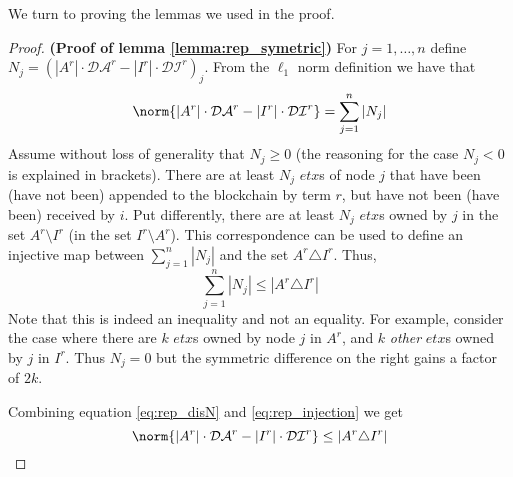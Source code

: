 We turn to proving the lemmas we used in the proof. 
\begin{proof}\textbf{(Proof of lemma \ref{lemma:rep_symetric})}
For $j=1,\dots,n$ define $N_j=\left(|A^r|\cdot \mathcal{DA}^r-|I^r|\cdot \mathcal{DI}^{r}\right)_j$. From the $\ell _1$ norm definition we have that
\begin{equation} \label{eq:rep_disN}
\norm{|A^r|\cdot \mathcal{DA}^r-|I^r|\cdot \mathcal{DI}^{r}} =\sum _{j=1}^n \left |N_j \right |
\end{equation} 
Assume without loss of generality that $N_j\geq 0$ (the reasoning for the case $N_j<0$ is explained in brackets). There are at least $N_j$ $etx$s of node $j$ that have been (have not been) appended to the blockchain by term $r$, but have not been (have been) received by $i$. Put differently, there are at least $N_j$ $etx$s owned by $j$ in the set $A^r \setminus I^{r}$ (in the set $I^{r}\setminus A^r$). This correspondence can be used to define an injective map between $\sum _{j=1}^n \left |N_j \right |$ and the set $A^r \triangle I^{r}$. Thus,
\begin{equation}\label{eq:rep_injection}
\sum _{j=1}^n \left |N_j \right |\leq |A^r \triangle I^{r}| 
\end{equation}
Note that this is indeed an inequality and not an equality. For example, consider the case where there are $k$ $etx$s owned by node $j$ in $A^r$, and $k$ \emph{other} $etx$s owned by $j$ in $I^r$. Thus $N_j=0$ but the symmetric difference on the right gains a factor of $2k$.

Combining equation \ref{eq:rep_disN} and \ref{eq:rep_injection} we get
\begin{equation}
\norm{|A^r|\cdot \mathcal{DA}^r-|I^r|\cdot \mathcal{DI}^{r}}\leq  |A^r \triangle I^{r}| 
\end{equation}
\end{proof}

